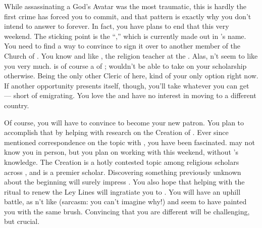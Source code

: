 \documentclass[char]{GL2020}
\begin{document}
While assassinating a God's Avatar was the most traumatic, this is hardly the first crime \cAntiChup{} has forced you to commit, and that pattern is exactly why you don't intend to answer to \cAntiChup{} forever. In fact, you have plans to end that this very weekend. The sticking point is the ``\iScholarship{},'' which is currently made out in \cAntiChup{}'s name. You need to find a way to convince \cAntiChup{} to sign it over to another member of the Church of \cTechGod{}. You know and like \cBeetle{\full}, the religion teacher at the \pSc{}. Alas, \cBeetle{\theydo}n't seem to like you very much. \cBeetle{} is of course a \cBeetle{\cleric} of \cTechGod{}; \cBeetle{\they} wouldn't be able to take on your scholarship otherwise. Being the only other Cleric of \cTechGod{} here, \cBeetle{\theyare} kind of your only option right now. If another opportunity presents itself, though, you'll take whatever you can get — short of emigrating. You love the \pTech{} and have no interest in moving to a different country. 

Of course, you will have to convince \cBeetle{} to become your new patron. You plan to accomplish that by helping \cEbbPriest{\full} with \cEbbPriest{\their} research on the Creation of \pEarth{}. Ever since \cAntiChup{} mentioned \cAntiChup{\their} correspondence on the topic with \cEbbPriest{}, you have been fascinated. \cEbbPriest{} may not know you in person, but you plan on working with \cEbbPriest{\them} this weekend, without \cAntiChup{}’s knowledge. The Creation is a hotly contested topic among religious scholars across \pEarth{}, and \cBeetle{} is a premier scholar. Discovering something previously unknown about the beginning will surely impress \cBeetle{\them}. You also hope that helping with the ritual to renew the Ley Lines will ingratiate you to \cBeetle{}. You will have an uphill battle, as \cBeetle{\theydo}n't like \cAntiChup{} (sarcasm: you can't imagine why!) and seem\cBeetle{\verbs} to have painted you with the same brush. Convincing \cBeetle{\them} that you are different will be challenging, but crucial.
\end{document}
